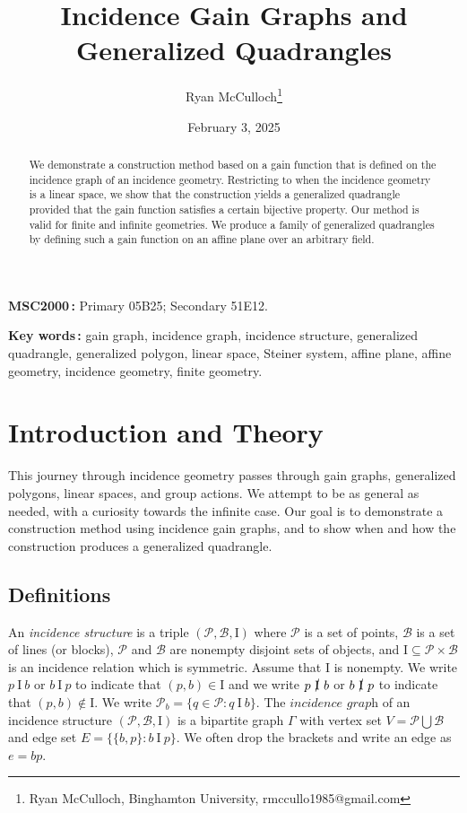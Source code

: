 \documentclass[11pt]{article}
\title{Incidence Gain Graphs and Generalized Quadrangles}
\author{Ryan McCulloch\footnote{Ryan McCulloch, Binghamton University, rmccullo1985@gmail.com}}
\date{February 3, 2025}
\theoremstyle{definition}
\begin{document}
\maketitle

\begin{abstract}
We demonstrate a construction method based on a gain function that is defined on the incidence graph of an incidence geometry.  Restricting to when the incidence geometry is a linear space, we show that the construction yields a generalized quadrangle provided that the gain function satisfies a certain bijective property.  Our method is valid for finite and infinite geometries.  We produce a family of generalized quadrangles by defining such a gain function on an affine plane over an arbitrary field.
\end{abstract}

{\small
\noindent
{\bf MSC2000\,:} Primary 05B25; Secondary 51E12.

\noindent
{\bf Key words\,:} gain graph, incidence graph, incidence structure, generalized quadrangle, generalized polygon, linear space, Steiner system, affine plane, affine geometry, incidence geometry, finite geometry.}

\section{Introduction and Theory}
This journey through incidence geometry passes through gain graphs, generalized polygons, linear spaces, and group actions.  We attempt to be as general as needed, with a curiosity towards the infinite case.  Our goal is to demonstrate a construction method using incidence gain graphs, and to show when and how the construction produces a generalized quadrangle.

\subsection{Definitions}

An \textit{incidence structure} is a triple $(\mathscr{P},\mathscr{B},\mathrm{I})$ where $\mathscr{P}$ is a set of points, $\mathscr{B}$ is a set of lines (or blocks), $\mathscr{P}$ and $\mathscr{B}$ are nonempty disjoint sets of objects, and $\mathrm{I} \subseteq \mathscr{P} \times\mathscr{B}$ is an incidence relation which is symmetric.  Assume that $\mathrm{I}$ is nonempty.  We write $p \  \mathrm{I} \  b$ or $b \  \mathrm{I} \ p$ to indicate that $(p,b) \in \mathrm{I}$ and we write $p \  \cancel{\mathrm{I}} \  b$ or $b \  \cancel{\mathrm{I}} \  p$ to indicate that $(p,b) \notin \mathrm{I}$.  We write $\mathscr{P}_b = \{ q \in \mathscr{P} : q \ \text{I} \ b \}$.  The $\textit{incidence graph}$ of an incidence structure $(\mathscr{P},\mathscr{B},\mathrm{I})$ is a bipartite graph $\Gamma$ with vertex set $V = \mathscr{P} \bigcup\mathscr{B}$ and edge set $E = \{ \{b,p\} : b \  \mathrm{I} \  p \}$.  We often drop the brackets and write an edge as $e = bp$.   
\end{document}
